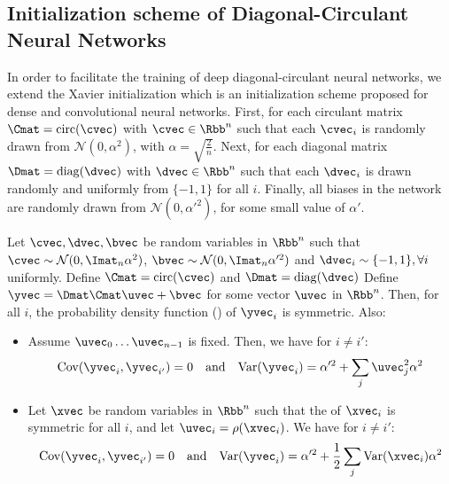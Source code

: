 \subsection{Initialization scheme of Diagonal-Circulant Neural Networks}
\label{subsection:ch4-initialization_scheme_of_diagonal-circulant_neural_networks}

In order to facilitate the training of deep diagonal-circulant neural networks, we extend the Xavier initialization \cite{glorot2010understanding} which is an initialization scheme proposed for dense and convolutional neural networks.
First, for each circulant matrix $\Cmat = \circulant (\cvec)$ with $\cvec \in \Rbb^n$ such that each $\cvec_i$ is randomly drawn from $\mathcal{N} \left(0,\alpha^2\right)$, with $\alpha = \sqrt{\frac{2}{n}}$.
Next, for each diagonal matrix $\Dmat = \diagonal (\dvec)$ with $\dvec \in \Rbb^n$ such that each $\dvec_{i}$ is drawn randomly and uniformly from $\{-1,1\}$ for all $i$.
Finally, all biases in the network are randomly drawn from $\mathcal{N}\left(0,\alpha'^{2}\right)$, for some small value of $\alpha'$.


\begin{lemma} \label{lemma:ch4-covariance}
  Let $\cvec, \dvec, \bvec$ be random variables in $\Rbb^n$ such that $\cvec \sim \mathcal{N}(0, \Imat_n\alpha^2)$, $\bvec \sim \mathcal{N}(0, \Imat_n\alpha'^2)$ and $\dvec_i \sim \{-1, 1\}, \forall i$ uniformly.
  Define $\Cmat = \circulant(\cvec)$ and $\Dmat = \diagonal(\dvec)$
  Define $\yvec = \Dmat \Cmat \uvec + \bvec$ for some vector $\uvec$ in $\Rbb^n$.
  Then, for all $i$, the probability density function (\pdf) of $\yvec_{i}$ is symmetric.
  Also:
  \begin{itemize}
    \item Assume $\uvec_0 \ldots \uvec_{n-1}$ is fixed. Then, we have for $i \neq i'$:
      \begin{equation}
	\Cov(\yvec_i, \yvec_{i'}) = 0 \quad \text{and} \quad
	\Var(\yvec_i) = \alpha'^2 + \sum_{j} \uvec_{j}^{2} \alpha^{2}
      \end{equation}
    \item Let $\xvec$ be random variables in $\Rbb^n$ such that the \pdf of $\xvec_i$ is symmetric for all $i$, and let $\uvec_i = \rho(\xvec_i)$.
      We have for $i \neq i':$
      \begin{equation}
	\Cov(\yvec_i, \yvec_{i'}) = 0 \quad \text{and} \quad
	\Var(\yvec_i) = \alpha'^2 + \frac{1}{2} \sum_{j} \Var(\xvec_i) \alpha^2
      \end{equation}
  \end{itemize}
\end{lemma}

